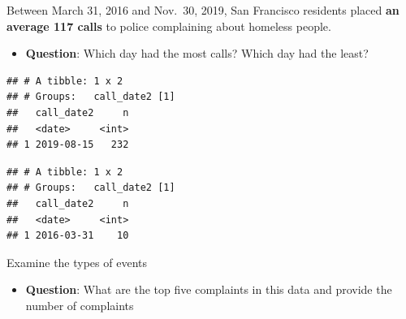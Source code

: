 \documentclass[]{book}
\newenvironment{Shaded}{\begin{snugshade}}{\end{snugshade}}
\newcommand{\DecValTok}[1]{\textcolor[rgb]{0.00,0.00,0.81}{#1}}
\newcommand{\KeywordTok}[1]{\textcolor[rgb]{0.13,0.29,0.53}{\textbf{#1}}}
\newcommand{\NormalTok}[1]{#1}
\newcommand{\OperatorTok}[1]{\textcolor[rgb]{0.81,0.36,0.00}{\textbf{#1}}}
\newcommand{\StringTok}[1]{\textcolor[rgb]{0.31,0.60,0.02}{#1}}
\providecommand{\tightlist}{%
  \setlength{\itemsep}{0pt}\setlength{\parskip}{0pt}}
\begin{document}
Between March 31, 2016 and Nov.~30, 2019, San Francisco residents placed \textbf{an average 117 calls} to police complaining about homeless people.

\begin{itemize}
\tightlist
\item
  \textbf{Question}: Which day had the most calls? Which day had the least?
\end{itemize}

\begin{Shaded}
\end{Shaded}

\begin{verbatim}
## # A tibble: 1 x 2
## # Groups:   call_date2 [1]
##   call_date2     n
##   <date>     <int>
## 1 2019-08-15   232
\end{verbatim}

\begin{Shaded}
\end{Shaded}

\begin{verbatim}
## # A tibble: 1 x 2
## # Groups:   call_date2 [1]
##   call_date2     n
##   <date>     <int>
## 1 2016-03-31    10
\end{verbatim}

Examine the types of events

\begin{Shaded}
\end{Shaded}

\begin{itemize}
\tightlist
\item
  \textbf{Question}: What are the top five complaints in this data and provide the number of complaints
\end{itemize}
\end{document}
